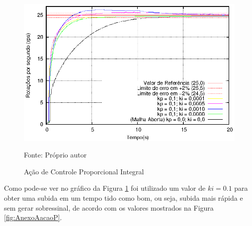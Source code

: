 






\begin{figure}[!htb]
\caption{Ação de Controle Proporcional Integral}
\center\includegraphics[scale=1.2]{./imagens/acaoPI.eps}
\label{fig:AnexoAacaoPI}

{\small Fonte: Próprio autor}
\end{figure}

Como pode-se ver no gráfico da Figura \ref{fig:AnexoAacaoPI} foi utilizado um valor de $ki = 0.1$ para obter uma subida em um tempo tido como bom, ou seja, subida mais rápida e sem gerar sobressinal, de acordo com os valores mostrados na Figura \ref{fig:AnexoAacaoP}.








